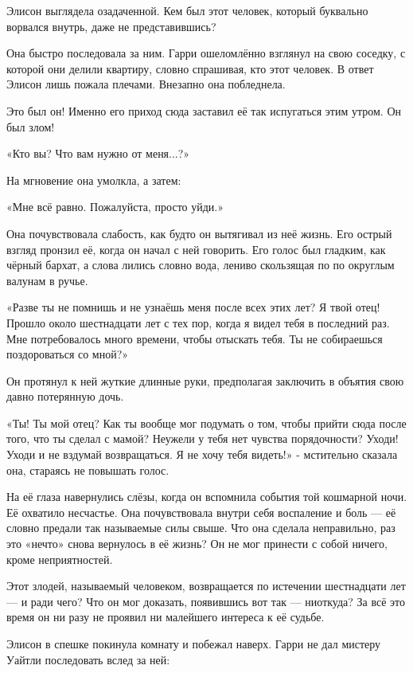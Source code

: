 \documentclass[a4paper,12pt]{book}
\begin{document}
Элисон выглядела озадаченной. Кем был этот человек, который буквально ворвался внутрь, даже не представившись?
\par
Она быстро последовала за ним. Гарри ошеломлённо взглянул на свою соседку, с которой они делили квартиру, словно спрашивая, кто этот человек. В ответ Элисон лишь пожала плечами. Внезапно она побледнела.
\par
Это был он! Именно его приход сюда заставил её так испугаться этим утром. Он был злом!
\par
«Кто вы? Что вам нужно от меня...?»
\par
На мгновение она умолкла, а затем:
\par
«Мне всё равно. Пожалуйста, просто уйди.»
\par
Она почувствовала слабость, как будто он вытягивал из неё жизнь. Его острый взгляд пронзил её, когда он начал с ней говорить. Его голос был гладким, как чёрный бархат, а слова лились словно вода, лениво скользящая по по округлым валунам в ручье.
\par
«Разве ты не помнишь и не узнаёшь меня после всех этих лет? Я твой отец! Прошло около шестнадцати лет с тех пор, когда я видел тебя в последний раз. Мне потребовалось много времени, чтобы отыскать тебя. Ты не собираешься поздороваться со мной?»
\par
Он протянул к ней жуткие длинные руки, предполагая заключить в объятия свою давно потерянную дочь.
\par
«Ты! Ты мой отец? Как ты вообще мог подумать о том, чтобы прийти сюда после того, что ты сделал с мамой? Неужели у тебя нет чувства порядочности? Уходи! Уходи и не вздумай возвращаться. Я не хочу тебя видеть!» - мстительно сказала она, стараясь не повышать голос.
\par
На её глаза навернулись слёзы, когда он вспомнила события той кошмарной ночи. Её охватило несчастье. Она почувствовала внутри себя воспаление и боль — её словно предали так называемые силы свыше. Что она сделала неправильно, раз это «нечто» снова вернулось в её жизнь? Он не мог принести с собой ничего, кроме неприятностей.
\par
Этот злодей, называемый человеком, возвращается по истечении шестнадцати лет — и ради чего? Что он мог доказать, появившись вот так — ниоткуда? За всё это время он ни разу не проявил ни малейшего интереса к её судьбе.
\par
Элисон в спешке покинула комнату и побежал наверх. Гарри не дал мистеру Уайтли последовать вслед за ней:
\par
\end{document}
